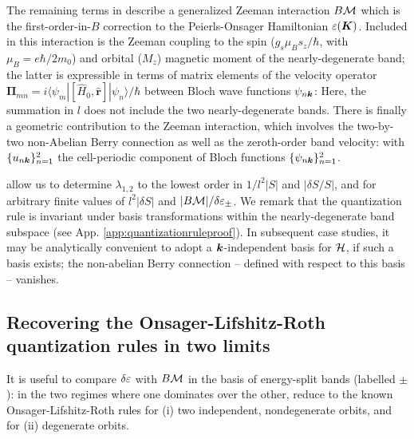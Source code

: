 \documentclass[aps, showpacs, twocolumn, notitlepage, superscriptaddress]{revtex4-1}
\begin{document}
The remaining terms in  describe a generalized Zeeman interaction $B{\cal M}$ which is the first-order-in-$B$ correction to the Peierls-Onsager Hamiltonian $\varepsilon(\boldsymbol{K})$\cite{rotheffham,blount_effham,kohn_effham}. Included in this interaction is the Zeeman coupling to the spin ($g_s\mu_Bs_z/\hbar$, with $\mu_B=e\hbar/2m_0$) and orbital ($M_z$) magnetic moment\cite{thonhauser_orbital_2005} of the nearly-degenerate band; the latter is expressible in terms of matrix elements of the velocity operator $\boldsymbol{\Pi}_{mn}=i\langle\psi_m|[\hat{H}_0, \hat{\boldsymbol{r}}]|\psi_n\rangle/\hbar$ between Bloch wave functions $\psi_{n\boldsymbol{k}}$:
Here, the summation in $l$ does not include the two nearly-degenerate bands.  There is finally a geometric contribution to the Zeeman interaction, which involves the two-by-two non-Abelian Berry connection\cite{berry_quantal_1984,wilczek_appearance_1984} as well as the  zeroth-order band velocity: 
with $\{u_{n\boldsymbol{k}}\}_{n=1}^2$ the cell-periodic component of Bloch functions $\{\psi_{n\boldsymbol{k}}\}_{n=1}^2$. 

 allow us to determine $\lambda_{1,2}$ to the lowest order  in $1/l^2|S|$ and $|\delta S/S|$, and for arbitrary finite values of $l^2|\delta S|$ and $|B{\cal M}|/\delta \varepsilon_{\pm}$. We remark that the quantization rule is invariant under basis transformations within the nearly-degenerate band subspace (see App. \ref{app:quantizationruleproof}).  In subsequent case studies, it may be analytically convenient to adopt a $\boldsymbol{k}$-independent basis for ${\cal H}$, if such a basis exists; the non-abelian Berry connection -- defined with respect to this basis -- vanishes.

\subsection{Recovering the Onsager-Lifshitz-Roth quantization rules in two limits}\label{sec:recoveronsager}

It is useful to compare $\delta \varepsilon$ with $B{\cal M}$ in the basis of energy-split bands (labelled $\pm$): in the two regimes where one dominates over the other,  reduce to the known Onsager-Lifshitz-Roth rules for (i) two independent, nondegenerate orbits, and for (ii) degenerate orbits.  \\
\end{document}
